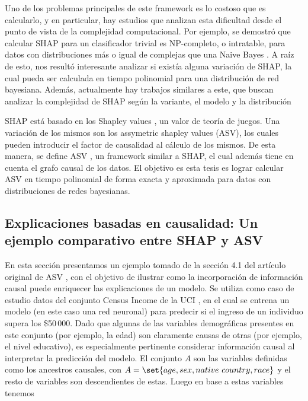 Uno de los problemas principales de este framework es lo costoso que es calcularlo, y en particular, hay estudios que analizan esta dificultad desde el punto de vista de la complejidad computacional. Por ejemplo, se demostró que calcular SHAP para un clasificador trivial es NP-completo, o intratable, para datos con distribuciones más o igual de complejas que una Naive Bayes \cite{arenas2021tractability}.
A raíz de esto, nos resultó interesante analizar si existía alguna variación de SHAP, la cual pueda ser calculada en tiempo polinomial para una distribución de red bayesiana. Además, actualmente hay trabajos similares a este, que buscan analizar la complejidad de SHAP según la variante, el modelo y la distribución \cite{marzouk2025computationaltractabilitymanyshapley} %

SHAP está basado en los Shapley values \cite{shapley1953value}, un valor de teoría de juegos.  Una variación de los mismos son los assymetric shapley values (ASV), los cuales pueden introducir el factor de causalidad al cálculo de los mismos. De esta manera, se define ASV \cite{frye2019asymmetric}, un framework similar a SHAP, el cual además tiene en cuenta el grafo causal de los datos. El objetivo es esta tesis es lograr calcular ASV en tiempo polinomial de forma exacta y aproximada para datos con distribuciones de redes bayesianas.

\subsection{Explicaciones basadas en causalidad: Un ejemplo comparativo entre SHAP y ASV} \label{asvCaseExample}

En esta sección presentamos un ejemplo tomado de la sección 4.1 del artículo original de ASV \cite{frye2019asymmetric}, con el objetivo de ilustrar como la incorporación de información causal puede enriquecer las explicaciones de un modelo. Se utiliza como caso de estudio datos del conjunto Census Income de la UCI \cite{dua2017uci}, en el cual se entrena un modelo (en este caso una red neuronal) para predecir si el ingreso de un individuo supera los \$50\,000. Dado que algunas de las variables demográficas presentes en este conjunto (por ejemplo, la edad) son claramente causas de otras (por ejemplo, el nivel educativo), es especialmente pertinente considerar información causal al interpretar la predicción del modelo. El conjunto $A$ son las variables definidas como los ancestros causales, con $A= \set{age, sex, native \ country, race}$ y el resto de variables son descendientes de estas. Luego en base a estas variables tenemos 

